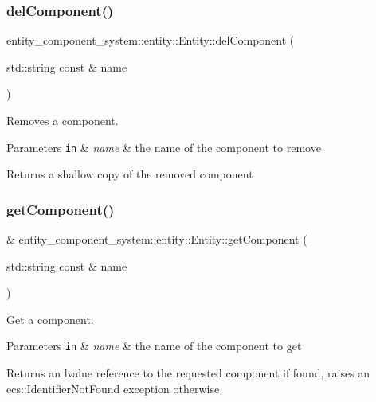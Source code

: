 \subsubsection{del\+Component()}
{\footnotesize{} entity\+\_\+component\+\_\+system\+::entity\+::\+Entity\+::del\+Component (\begin{DoxyParamCaption}\item[{std\+::string const \&}]{name }\end{DoxyParamCaption})}



Removes a component. 


\begin{DoxyParams}[1]{Parameters}
\mbox{\tt in}  & {\em name} & the name of the component to remove \\
\hline
\end{DoxyParams}
\begin{DoxyReturn}{Returns}
a shallow copy of the removed component 
\end{DoxyReturn}
\label{classentity__component__system_1_1entity_1_1_entity_a7154f5da6afa09c0c6988c94d3bfe4a6} 
\subsubsection{get\+Component()\hspace{0.1cm}{\footnotesize\ttfamily [1/2]}}
{\footnotesize{} \& entity\+\_\+component\+\_\+system\+::entity\+::\+Entity\+::get\+Component (\begin{DoxyParamCaption}\item[{std\+::string const \&}]{name }\end{DoxyParamCaption})}



Get a component. 


\begin{DoxyParams}[1]{Parameters}
\mbox{\tt in}  & {\em name} & the name of the component to get \\
\hline
\end{DoxyParams}
\begin{DoxyReturn}{Returns}
an lvalue reference to the requested component if found, raises an ecs\+::\+Identifier\+Not\+Found exception otherwise 
\end{DoxyReturn}
\label{classentity__component__system_1_1entity_1_1_entity_af1ea7f087b1873b3d88a850c0d5a1d1c} 
